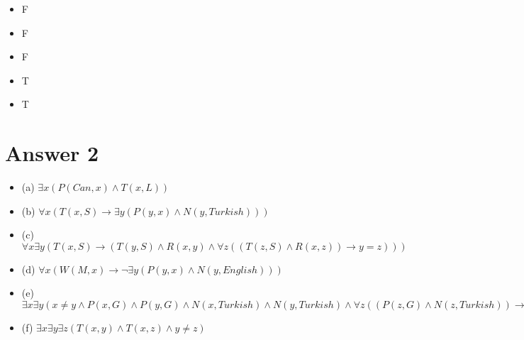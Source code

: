 \documentclass[12pt]{article}
\begin{document}
\begin{itemize}
\centering
    \item F
    \item F
    \item F
    \item T
    \item T
\end{itemize}

\section*{Answer 2}
\begin{itemize}
    \centering
	\item(a) $\exists x (P(Can, x) \wedge T(x,L)) $ \\
	\item(b) $\forall x (T(x, S) \rightarrow \exists y(P(y,x) \wedge N(y, Turkish)))$\\
	\item(c) $\forall x \exists y(T(x,S) \rightarrow (T(y,S) \wedge R(x,y) \wedge \forall z((T(z,S)\wedge R(x,z)) \rightarrow y = z))) $\\
	\item(d) $\forall x(W(M,x) \rightarrow \neg \exists y(P(y,x)\wedge N(y, English)))$\\
	\item(e) $\exists x \exists y(x\neq y \wedge P(x,G) \wedge P(y,G) \wedge N(x, Turkish) \wedge N(y, Turkish) \wedge \forall z((P(z,G)\wedge N(z,Turkish))\rightarrow (z = x \lor z = y)))$\\
	\item(f) $\exists x \exists y \exists z (T(x,y)\wedge T(x,z) \wedge y \neq z) $\\

\end{itemize}
\end{document}
